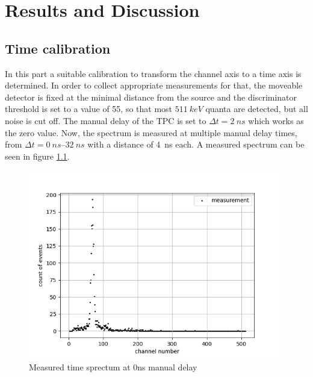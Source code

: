 \chapter{Results and Discussion}

\section{Time calibration}
\label{chap:time cal}
In this part a suitable calibration to transform the channel axis to a time axis is determined. In order to collect appropriate measurements for that, the moveable detector is fixed at the minimal distance from the source and the discriminator threshold is set to a value of 55, so that most $\SI{511}{keV}$ quanta are detected, but all noise is cut off. The manual delay of the TPC is set to $\Delta t = \SI{2}{ns}$ which works as the zero value. Now, the spectrum is measured at multiple manual delay times, from $\Delta t = \SIrange[]{0}{32}{ns}$ with a distance of \SI{4}{ns} each. A measured spectrum can be seen in figure \ref{fig:0nsnofit}.

\begin{figure}[H]
    \centering
    \includegraphics[width=110mm,scale=0.5]{Positronium/include/0nsnofit.png}
    \caption{Measured time sprectum at 0ns manual delay} 
    \label{fig:0nsnofit}
\end{figure}


